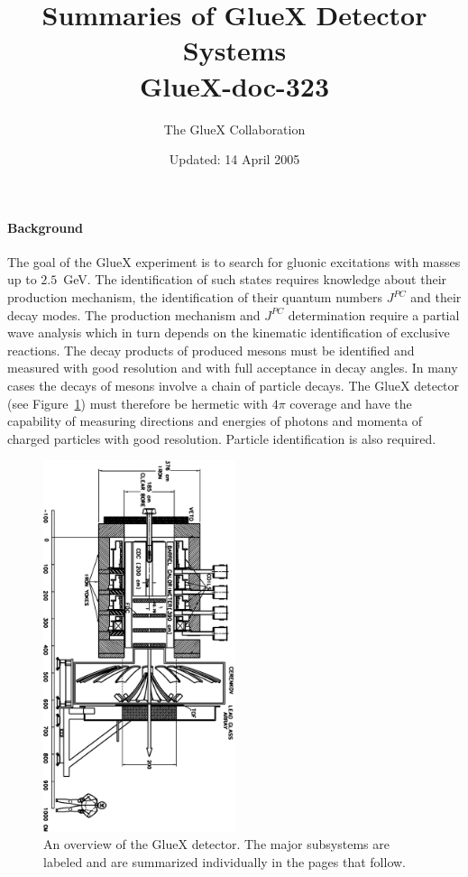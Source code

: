
%
%
\title{Summaries of GlueX Detector Systems \\
\small{GlueX-doc-323} \\
}
%
\date{Updated: 14 April 2005}
%
\author{The GlueX Collaboration}
%

\maketitle
%
%
\paragraph{Background}
The goal of the GlueX experiment is to search for gluonic excitations
with masses up to $2.5$~GeV.  The identification of such states
requires knowledge about their production mechanism, the
identification of their quantum numbers $J^{PC}$ and their decay
modes. The production mechanism and $J^{PC}$ determination require a
partial wave analysis which in turn depends on the kinematic
identification of exclusive reactions. The decay products of produced
mesons must be identified and measured with good resolution and with
full acceptance in decay angles.  In many cases the decays of mesons
involve a chain of particle decays.  The GlueX detector (see
Figure~\ref{fig:ch6-hd_schematic}) must therefore be hermetic with 
$4\pi$ coverage and have the capability of measuring directions and
energies of photons and momenta of charged particles with good 
resolution.  Particle identification is also required.


\begin{figure}[t]
\centering
\includegraphics[width=0.50\textwidth,angle=90]{ch6_gluex_detector.eps}
\caption[An overview of the GlueX detector.]{\label{fig:ch6-hd_schematic}
An overview of the GlueX detector. The major subsystems are labeled and 
are summarized individually in the pages that follow. }
\end{figure}

